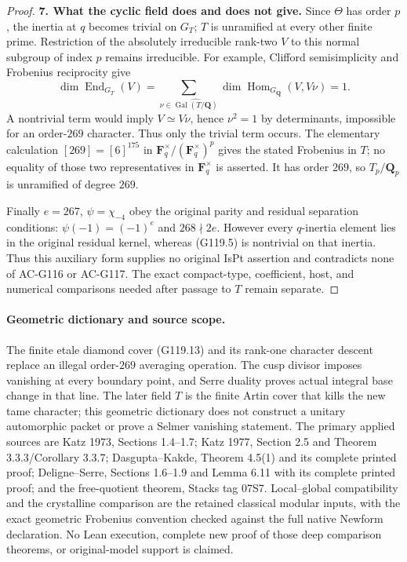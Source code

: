 \begin{proof}
\textbf{7. What the cyclic field does and does not give.}
Since $\Theta$ has order $p$, the inertia at $q$ becomes trivial
on $G_T$; $T$ is unramified at every other finite prime.
Restriction of the absolutely irreducible rank-two $V$ to this
normal subgroup of index $p$ remains irreducible.
For example, Clifford semisimplicity and Frobenius reciprocity
give
\[
 \dim\operatorname{End}_{G_T}(V)
   =\sum_{\nu\in\widehat{\operatorname{Gal}(T/\mathbf Q)}}
       \dim\operatorname{Hom}_{G_{\mathbf Q}}(V,V\nu)=1.
 \tag{G119.17}
\]
A nontrivial term would imply $V\simeq V\nu$, hence
$\nu^2=1$ by determinants, impossible for an order-$269$
character.  Thus only the trivial term occurs.
The elementary calculation $[269]=[6]^{175}$ in
$\mathbf F_q^\times/(\mathbf F_q^\times)^p$
gives the stated Frobenius in $T$; no equality of those two
representatives in $\mathbf F_q^\times$ is asserted.
It has order $269$, so $T_p/\mathbf Q_p$ is unramified of
degree $269$.

Finally $e=267$, $\psi=\chi_{-4}$ obey the original parity and
residual separation conditions: $\psi(-1)=(-1)^e$ and
$268\nmid2e$.
However every $q$-inertia element lies in the original residual
kernel, whereas (G119.5) is nontrivial on that inertia.
Thus this auxiliary form supplies no original IsPt assertion and
contradicts none of AC-G116 or AC-G117.
The exact compact-type, coefficient, host, and numerical
comparisons needed after passage to $T$ remain separate.
\end{proof}

\paragraph{Geometric dictionary and source scope.}
The finite etale diamond cover (G119.13) and its rank-one
character descent replace an illegal order-$269$ averaging
operation.  The cusp divisor imposes vanishing at every boundary
point, and Serre duality proves actual integral base change in
that line.  The later field $T$ is the finite Artin cover that
kills the new tame character; this geometric dictionary does not
construct a unitary automorphic packet or prove a Selmer
vanishing statement.
The primary applied sources are Katz 1973, Sections 1.4--1.7;
Katz 1977, Section 2.5 and Theorem 3.3.3/Corollary 3.3.7;
Dasgupta--Kakde, Theorem 4.5(1) and its complete printed proof;
Deligne--Serre, Sections 1.6--1.9 and Lemma 6.11 with its complete
printed proof; and the free-quotient theorem, Stacks tag 07S7.
Local--global compatibility and the crystalline comparison are
the retained classical modular inputs, with the exact geometric
Frobenius convention checked against the full native Newform
declaration.  No Lean execution, complete new proof of those
deep comparison theorems, or original-model support is claimed.
